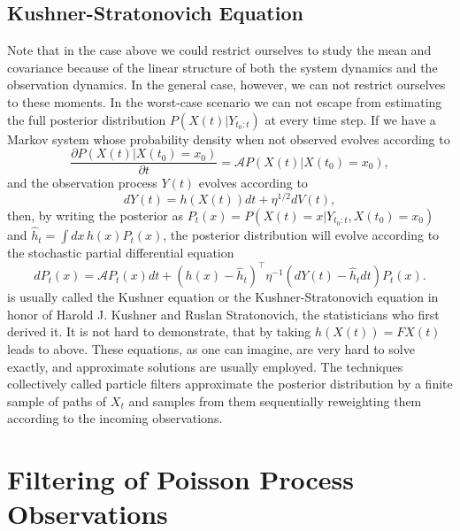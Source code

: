 \subsection{Kushner-Stratonovich Equation}

Note that in the case above we could restrict ourselves to study the mean and covariance because of the linear structure of both the system dynamics and the observation dynamics. In the general case, however, we can not restrict ourselves to these moments. In the worst-case scenario we can not escape from estimating the full posterior distribution $P(X(t)|Y_{t_0:t})$ at every time step. If we have a Markov system whose probability density when not observed evolves according to
\begin{equation}
\label{eq:kolmogorov_fw}
\frac{\partial P(X(t)| X(t_0) = x_0)}{\partial t} = \mathcal{A} P(X(t)|X({t_0})=x_0),
\end{equation}
and the observation process $Y(t)$ evolves according to
\[
dY(t) = h(X(t)) dt + \eta^{1/2} dV(t),
\]
then, by writing the posterior as $P_t(x) = P(X(t)=x|Y_{t_0:t},X({t_0})=x_0)$ and $\hat{h}_t = \int dx\, h(x) P_t(x)$, the posterior distribution will evolve according to the stochastic partial differential equation
\begin{equation}
\label{eq:kushner}
dP_t(x) = \mathcal{A} P_t(x) dt + (h(x) - \hat{h}_t)^\top \eta^{-1} (dY(t) - \hat{h}_t dt) P_t(x).
\end{equation}
 is usually called the Kushner equation or the Kushner-Stratonovich equation in honor of Harold J. Kushner and Ruslan Stratonovich, the statisticians who first derived it. It is not hard to demonstrate, that by taking $h(X(t)) = F X(t)$ leads to  above.\cite{Bucy1965} These equations, as one can imagine, are very hard to solve exactly, and approximate solutions are usually employed. The techniques collectively called particle filters approximate the posterior distribution by a finite sample of paths of $X_t$ and samples from them sequentially reweighting them according to the incoming observations.
 
\section{Filtering of Poisson Process Observations}
 
